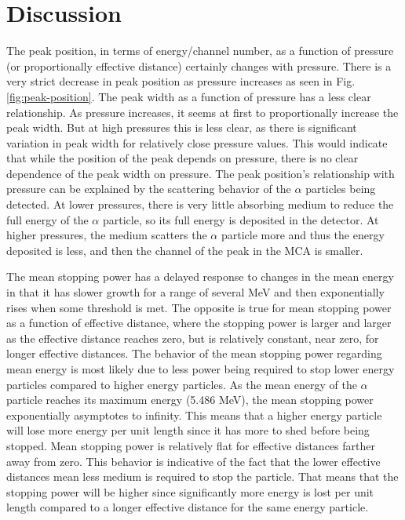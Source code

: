 \section{Discussion}

The peak position, in terms of energy/channel number, as a function of pressure (or proportionally effective distance) certainly changes with pressure. There is a very strict decrease in peak position as pressure increases as seen in Fig. \ref{fig:peak-position}. The peak width as a function of pressure has a less clear relationship. As pressure increases, it seems at first to proportionally increase the peak width. But at high pressures this is less clear, as there is significant variation in peak width for relatively close pressure values. This would indicate that while the position of the peak depends on pressure, there is no clear dependence of the peak width on pressure. The peak position’s relationship with pressure can be explained by the scattering behavior of the $\alpha$ particles being detected. At lower pressures, there is very little absorbing medium to reduce the full energy of the $\alpha$ particle, so its full energy is deposited in the detector. At higher pressures, the medium scatters the $\alpha$ particle more and thus the energy deposited is less, and then the channel of the peak in the MCA is smaller.

The mean stopping power has a delayed response to changes in the mean energy in that it has slower growth for a range of several MeV and then exponentially rises when some threshold is met. The opposite is true for mean stopping power as a function of effective distance, where the stopping power is larger and larger as the effective distance reaches zero, but is relatively constant, near zero, for longer effective distances. The behavior of the mean stopping power regarding mean energy is most likely due to less power being required to stop lower energy particles compared to higher energy particles. As the mean energy of the $\alpha$ particle reaches its maximum energy (5.486 MeV), the mean stopping power exponentially asymptotes to infinity. This means that a higher energy particle will lose more energy per unit length since it has more to shed before being stopped. Mean stopping power is relatively flat for effective distances farther away from zero. This behavior is indicative of the fact that the lower effective distances mean less medium is required to stop the particle. That means that the stopping power will be higher since significantly more energy is lost per unit length compared to a longer effective distance for the same energy particle.

